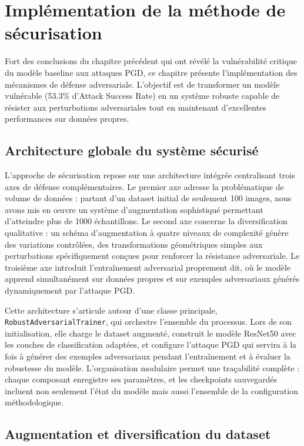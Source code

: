 \section{Implémentation de la méthode de sécurisation}

Fort des conclusions du chapitre précédent qui ont révélé la vulnérabilité critique du modèle baseline aux attaques PGD, ce chapitre présente l'implémentation des mécanismes de défense adversariale. L'objectif est de transformer un modèle vulnérable (53.3\% d'Attack Success Rate) en un système robuste capable de résister aux perturbations adversariales tout en maintenant d'excellentes performances sur données propres.

\subsection{Architecture globale du système sécurisé}

L'approche de sécurisation repose sur une architecture intégrée centralisant trois axes de défense complémentaires. Le premier axe adresse la problématique de volume de données : partant d'un dataset initial de seulement 100 images, nous avons mis en œuvre un système d'augmentation sophistiqué permettant d'atteindre plus de 1000 échantillons. Le second axe concerne la diversification qualitative : un schéma d'augmentation à quatre niveaux de complexité génère des variations contrôlées, des transformations géométriques simples aux perturbations spécifiquement conçues pour renforcer la résistance adversariale. Le troisième axe introduit l'entraînement adversarial proprement dit, où le modèle apprend simultanément sur données propres et sur exemples adversariaux générés dynamiquement par l'attaque PGD.

Cette architecture s'articule autour d'une classe principale, \texttt{RobustAdversarialTrainer}, qui orchestre l'ensemble du processus. Lors de son initialisation, elle charge le dataset augmenté, construit le modèle ResNet50 avec les couches de classification adaptées, et configure l'attaque PGD qui servira à la fois à générer des exemples adversariaux pendant l'entraînement et à évaluer la robustesse du modèle. L'organisation modulaire permet une traçabilité complète : chaque composant enregistre ses paramètres, et les checkpoints sauvegardés incluent non seulement l'état du modèle mais aussi l'ensemble de la configuration méthodologique.

\subsection{Augmentation et diversification du dataset}

